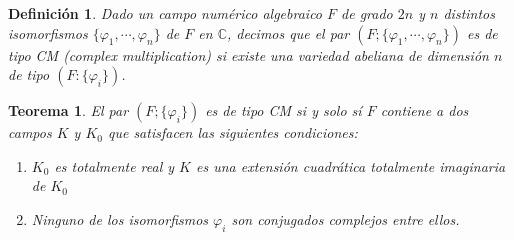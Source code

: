 \documentclass[letterpaper]{report}
\newtheorem{teorema}{Teorema}[chapter]
\newtheorem{def.}{Definici\'on}[chapter]
\newcommand{\co}{\ensuremath{\mathbb C }}
\begin{document}
\begin{def.}
Dado un campo numérico algebraico $F$ de grado $2n$ y $n$ distintos isomorfismos  \hbox{$\lbrace\varphi_1,\cdots,\varphi_{n}\rbrace$} de $F$ en $\co$, decimos que el par \hbox{$(F;\lbrace\varphi_1,\cdots,\varphi_{n}\rbrace)$} es de tipo CM (complex multiplication) si existe una variedad abeliana de dimensión $n$ de tipo $(F:\lbrace\varphi_i\rbrace)$.
\end{def.}
\begin{teorema}\label{teoremaCM}
El par $(F;\lbrace\varphi_i\rbrace)$ es de tipo CM si y solo sí $F$ contiene a dos campos $K$ y $K_0$ que satisfacen las siguientes condiciones:
\begin{enumerate}
	\item[(CM 1)] $K_0$ es totalmente real y $K$ es una extensión cuadrática totalmente imaginaria de $K_0$
	\item[(CM 2)] Ninguno de los isomorfismos $\varphi_i$ son conjugados complejos entre ellos. 
\end{enumerate} 
\end{teorema}
\end{document}
